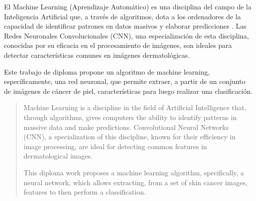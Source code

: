 \begin{resumen}	
	El Machine Learning (Aprendizaje Automático) es una disciplina del campo de la Inteligencia Artificial que, a través de algoritmos, dota a los ordenadores de la capacidad de identificar patrones en datos masivos y elaborar predicciones . Las Redes Neuronales Convolucionales (CNN), una especialización de esta disciplina, conocidas por su eficacia en el procesamiento de imágenes, son ideales para detectar características comunes en imágenes dermatológicas. 
	
	Este trabajo de diploma propone un algoritmo de machine learning, específicamente, una red neuronal, que permite extraer, a partir de un conjunto de imágenes de cáncer de piel, características para luego realizar una clasificación.
\end{resumen}

\begin{abstract}
	Machine Learning is a discipline in the field of Artificial Intelligence that, through algorithms, gives computers the ability to identify patterns in massive data and make predictions. Convolutional Neural Networks (CNN), a specialization of this discipline, known for their efficiency in image processing, are ideal for detecting common features in dermatological images. 
	
	This diploma work proposes a machine learning algorithm, specifically, a neural network, which allows extracting, from a set of skin cancer images, features to then perform a classification.
\end{abstract}
